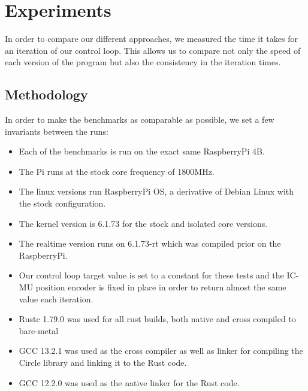\chapter{Experiments}
\label{chap:experiments}

In order to compare our different approaches, we measured the time it takes for an iteration of our control loop.
This allows us to compare not only the speed of each version of the program but also the consistency in the iteration times.

\section{Methodology}
\label{sec:experiments:methodology}

In order to make the benchmarks as comparable as possible, we set a few invariants between the runs:
\begin{itemize}
  \item Each of the benchmarks is run on the exact same RaspberryPi 4B.
  \item The Pi runs at the stock core frequency of 1800MHz.
  \item The linux versions run RaspberryPi OS, a derivative of Debian Linux with the stock configuration.
  \item The kernel version is 6.1.73 for the stock and isolated core versions.
  \item The realtime version runs on 6.1.73-rt which was compiled prior on the RaspberryPi.
  \item Our control loop target value is set to a constant for these tests and the IC-MU position encoder is fixed in place in order to return almost the same value each iteration.
  \item Rustc 1.79.0 was used for all rust builds, both native and cross compiled to bare-metal
  \item GCC 13.2.1 was used as the cross compiler as well as linker for compiling the Circle library and linking it to the Rust code.
  \item GCC 12.2.0 was used as the native linker for the Rust code.
\end{itemize}

